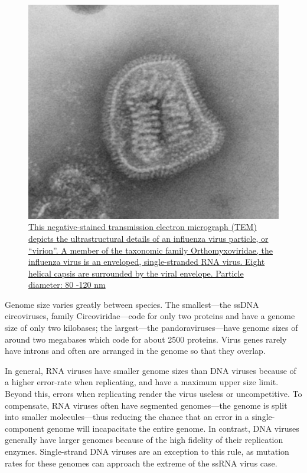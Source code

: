 \begin{figure}

{\centering \includegraphics[width=0.7\linewidth]{./figures/bacteria/Influenza_virus_particle_8430_lores} 

}

\caption{\href{https://commons.wikimedia.org/wiki/File:Influenza_virus_particle_8430_lores.jpg}{This negative-stained transmission electron micrograph (TEM) depicts the ultrastructural details of an influenza virus particle, or ``virion''. A member of the taxonomic family Orthomyxoviridae, the influenza virus is an enveloped, single-stranded RNA virus. Eight helical capsis are surrounded by the viral envelope. Particle diameter: 80 -120 nm}}\label{fig:influenza}
\end{figure}

Genome size varies greatly between species. The smallest---the ssDNA circoviruses, family Circoviridae---code for only two proteins and have a genome size of only two kilobases; the largest---the pandoraviruses---have genome sizes of around two megabases which code for about 2500 proteins. Virus genes rarely have introns and often are arranged in the genome so that they overlap.

In general, RNA viruses have smaller genome sizes than DNA viruses because of a higher error-rate when replicating, and have a maximum upper size limit. Beyond this, errors when replicating render the virus useless or uncompetitive. To compensate, RNA viruses often have segmented genomes---the genome is split into smaller molecules---thus reducing the chance that an error in a single-component genome will incapacitate the entire genome. In contrast, DNA viruses generally have larger genomes because of the high fidelity of their replication enzymes. Single-strand DNA viruses are an exception to this rule, as mutation rates for these genomes can approach the extreme of the ssRNA virus case.

